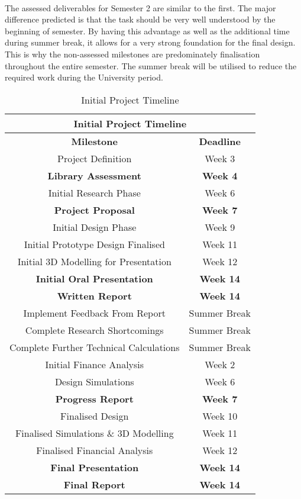 \paragraph{}
The assessed deliverables for Semester 2 are similar to the first. The major difference predicted is that the task should be very well understood by the beginning of semester. By having this advantage as well as the additional time during summer break, it allows for a very strong foundation for the final design. This is why the non-assessed milestones are predominately finalisation throughout the entire semester. The summer break will be utilised to reduce the required work during the University period. 

\begin{table}[H]
\centering
\begin{tabular}{||c c||} 
 \hline
 \multicolumn{2}{|c|}{\textbf{Initial Project Timeline}} \\ [0.5ex] 
 \hline\hline
 \textbf{Milestone} & \textbf{Deadline} \\ 
 \hline\hline
 Project Definition & Week 3 \\ 
 \textbf{Library Assessment} & \textbf{Week 4} \\
 Initial Research Phase & Week 6 \\
 \textbf{Project Proposal} & \textbf{Week 7} \\
 Initial Design Phase & Week 9 \\
 Initial Prototype Design Finalised & Week 11 \\
 Initial 3D Modelling for Presentation & Week 12 \\
  \textbf{Initial Oral Presentation} & \textbf{Week 14} \\ 
 \textbf{Written Report} & \textbf{Week 14} \\ 
 Implement Feedback From Report & Summer Break \\
 Complete Research Shortcomings & Summer Break \\
 Complete Further Technical Calculations & Summer Break \\
 Initial Finance Analysis & Week 2 \\
 Design Simulations & Week 6 \\
 \textbf{Progress Report} & \textbf{Week 7} \\
 Finalised Design & Week 10 \\
 Finalised Simulations \& 3D Modelling & Week 11 \\
 Finalised Financial Analysis & Week 12 \\
 \textbf{Final Presentation} & \textbf{Week 14} \\
 \textbf{Final Report} & \textbf{Week 14} \\ [1ex] 
 \hline
\end{tabular}
\caption{Initial Project Timeline}
\label{table:milestones_1}
\end{table}    

